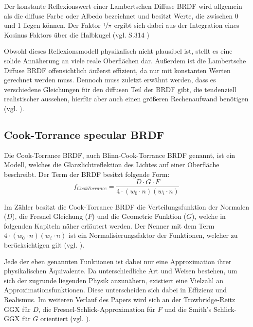 \documentclass[
  11pt,
  a4paper,
  oneside
  ]{article}
\begin{document}
Der konstante Reflexionswert einer Lambertschen Diffuse BRDF wird allgemein als die diffuse Farbe oder Albedo bezeichnet und besitzt Werte, die zwischen 0 und 1 liegen können. Der Faktor $\nicefrac{1}{\pi}$ ergibt sich dabei aus der Integration eines Kosinus Faktors über die Halbkugel 
(vgl. S.314 \cite{realTimeRendering4th})

Obwohl dieses Reflexionsmodell physikalisch nicht plausibel ist, stellt es eine solide Annäherung an viele reale Oberflächen dar. Außerdem ist die Lambertsche Diffuse BRDF offensichtlich äußerst effizient, da nur mit konstanten Werten gerechnet werden muss. Dennoch muss zuletzt erwähnt werden, dass es verschiedene Gleichungen für den diffusen Teil der BRDF gibt, die tendenziell realistischer aussehen, hierfür aber auch einen größeren Rechenaufwand benötigen (vgl. \cite{learnOpenGL}).
\subsection{Cook-Torrance specular BRDF}
Die Cook-Torrance BRDF, auch Blinn-Cook-Torrance BRDF genannt, ist ein Modell, welches die Glanzlichtreflektion des Lichtes auf einer Oberfläche beschreibt. Der Term der BRDF besitzt folgende Form: 
\begin{equation}
  f_{CookTorrance}=\dfrac{D\cdot G\cdot F}{4\cdot \left( w_{0}\cdot n\right) \left( w_{i}\cdot n\right) }
\end{equation}

Im Zähler besitzt die Cook-Torrance BRDF die Verteilungsfunktion der Normalen ($D$), die Fresnel Gleichung ($F$) und die Geometrie Funktion ($G$), welche in folgenden Kapiteln näher erläutert werden.  Der Nenner mit dem Term $4\cdot \left( w_{0}\cdot n\right) \left( w_{i}\cdot n\right)$ ist ein Normalisierungsfaktor der Funktionen, welcher zu berücksichtigen gilt (vgl. \cite{learnOpenGL}).

Jede der eben genannten Funktionen ist dabei nur eine Approximation ihrer physikalischen Äquivalente. Da unterschiedliche Art und Weisen bestehen, um sich der zugrunde liegenden Physik anzunähern, existiert eine Vielzahl an Approximationsfunktionen. Diese unterscheiden sich dabei in Effizienz und Realismus. Im weiteren Verlauf des Papers wird sich an der Trowbridge-Reitz GGX für $D$, die Fresnel-Schlick-Approximation für $F$ und die Smith's Schlick-GGX für $G$ orientiert 
(vgl. \cite{learnOpenGL}).
\end{document}
